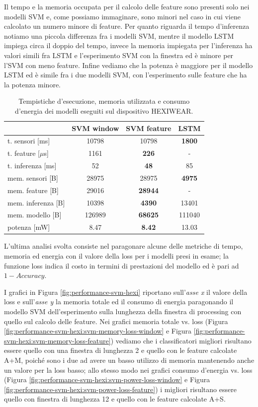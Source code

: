 Il tempo e la memoria occupata per il calcolo delle feature sono presenti solo nei modelli SVM e, come possiamo immaginare, sono minori nel caso in cui viene calcolato un numero minore di feature. Per quanto riguarda il tempo d'inferenza notiamo una piccola differenza fra i modelli SVM, mentre il modello LSTM impiega circa il doppio del tempo, invece la memoria impiegata per l'inferenza ha valori simili fra LSTM e l'esperimento SVM con la finestra ed è minore per l'SVM con meno feature. Infine vediamo che la potenza è maggiore per il modello LSTM ed è simile fra i due modelli SVM, con l'esperimento sulle feature che ha la potenza minore.

\begin{table}
    \centering
    \begin{tabular}{l c c c}
        \hline
        & SVM window & SVM feature & LSTM \\
        \hline
        t. sensori [ms] & 10798 & 10798 & \textbf{1800} \\
        t. feature [$\mu$s] & 1161 & \textbf{226} & - \\
        t. inferenza [ms] & 52 & \textbf{48} & 85 \\
        \hline
        mem. sensori [B] & 28975 & 28975 & \textbf{4975} \\
        mem. feature [B] & 29016 & \textbf{28944} & - \\
        mem. inferenza [B] & 10398 & \textbf{4390} & 13401 \\
        mem. modello [B] & 126989 & \textbf{68625} & 111040 \\
        \hline
        potenza [mW] & 8.47 & \textbf{8.42} & 13.03 \\
        \hline
    \end{tabular}
    \caption{Tempistiche d'esecuzione, memoria utilizzata e consumo d'energia dei modelli eseguiti sul dispositivo HEXIWEAR.}
    \label{tab:memory-hexi}
\end{table}

L'ultima analisi svolta consiste nel paragonare alcune delle metriche di tempo, memoria ed energia con il valore della loss per i modelli presi in esame; la funzione loss indica il costo in termini di prestazioni del modello ed è pari ad $1 - Accuracy$.

I grafici in Figura \ref{fig:performance-svm-hexi} riportano sull'\textit{asse x} il valore della loss e sull'\textit{asse y} la memoria totale ed il consumo di energia paragonando il modello SVM dell'esperimento sulla lunghezza della finestra di processing con quello sul calcolo delle feature. 
Nei grafici memoria totale vs. loss (Figura \ref{fig:performance-svm-hexi:svm-memory-loss-window} e Figura \ref{fig:performance-svm-hexi:svm-memory-loss-feature}) vediamo che i classificatori migliori risultano essere quello con una finestra di lunghezza 2 e quello con le feature calcolate A+M, poiché sono i due ad avere un basso utilizzo di memoria mantenendo anche un valore per la loss basso; allo stesso modo nei grafici consumo d'energia vs. loss (Figura \ref{fig:performance-svm-hexi:svm-power-loss-window} e Figura \ref{fig:performance-svm-hexi:svm-power-loss-feature}) i migliori risultano essere quello con finestra di lunghezza 12 e quello con le feature calcolate A+S.

